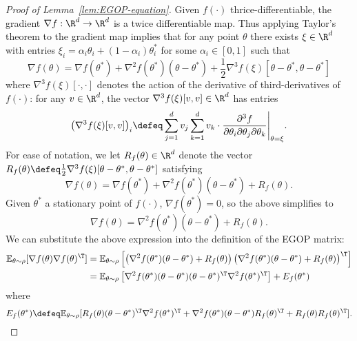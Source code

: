 \begin{proof}[Proof of Lemma~\ref{lem:EGOP-equation}]
    Given $f(\cdot)$ thrice-differentiable, the gradient $\nabla f:\R^d \rightarrow \R^d$ is a twice differentiable map. Thus applying Taylor's theorem to the gradient map implies that for any point $\theta$ there exists $\xi\in \R^d$ with entries $\xi_i = \alpha_i \theta_i + (1-\alpha_i)\theta^*_i$ for some $\alpha_i\in [0,1]$ such that
    \[
        \nabla f(\theta) = \nabla f(\theta^*) + \nabla^2 f(\theta^*)(\theta-\theta^*) + \frac{1}{2}\nabla^3 f(\xi)[\theta-\theta^*, \theta-\theta^*]
   \]
   where $\nabla^3 f(\xi)[\cdot, \cdot]$ denotes the action of the derivative of third-derivatives of $f(\cdot)$: for any $v\in \R^d$, the vector $\nabla^3 f(\xi)[v, v]\in \R^d$ has entries
   \[
        \big(\nabla^3 f(\xi)[v, v]\big)_i \defeq \sum_{j=1}^d v_j \sum_{k=1}^d v_k\cdot \frac{\partial^3 f}{\partial \theta_i \partial \theta_j \partial \theta_k}\Bigg|_{\theta=\xi}.
   \]
   For ease of notation, we let $R_f(\theta)\in \R^d$ denote the vector $R_f(\theta)\defeq \frac{1}{2}\nabla^3 f(\xi)[\theta-\theta^*, \theta-\theta^*]$ satisfying
   \[
        \nabla f(\theta) = \nabla f(\theta^*) + \nabla^2 f(\theta^*)(\theta-\theta^*) + R_f(\theta).
   \]
   Given $\theta^*$ a stationary point of $f(\cdot)$, $\nabla f(\theta^*) = 0$, so the above simplifies to
   \[
     \nabla f(\theta) = \nabla^2 f(\theta^*)(\theta-\theta^*) + R_f(\theta).
   \]
   We can substitute the above expression into the definition of the EGOP matrix:
   \begin{align*}
       \mathbb{E}_{\theta\sim \rho}[\nabla f(\theta)\nabla f(\theta)^\T] &= \mathbb{E}_{\theta\sim \rho}\left[\left( \nabla^2 f(\theta^*)(\theta-\theta^*) + R_f(\theta)\right)\left( \nabla^2 f(\theta^*)(\theta-\theta^*) + R_f(\theta)\right)^\T  \right]\\
       &=\mathbb{E}_{\theta\sim \rho}\left[\nabla^2 f(\theta^*)(\theta-\theta^*)(\theta-\theta^*)^\T \nabla^2 f(\theta^*)^\T\right] + E_f(\theta^*)
   \end{align*}
   where
   \[
        E_f(\theta^*) \defeq \mathbb{E}_{\theta\sim \rho}[R_f(\theta)(\theta-\theta^*)^\T\nabla^2 f(\theta^*)^\T + \nabla^2 f(\theta^*)(\theta-\theta^*)R_f(\theta)^\T + R_f(\theta) R_f(\theta)^\T].
   \]


\end{proof}
